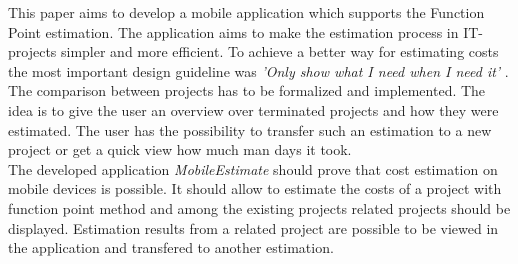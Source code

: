 This paper aims to develop a mobile application which supports the Function Point estimation. The application aims to make the estimation process in IT-projects simpler and more efficient. To achieve a better way for estimating costs the most important design guideline was \textit{'Only show what I need when I need it'} \cite{materialdesign}. The comparison between projects has to be formalized and implemented. The idea is to give the user an overview over terminated projects and how they were estimated. The user has the possibility to transfer such an estimation to a new project or get a quick view how much man days it took.\\
The developed application \textit{MobileEstimate} should prove that cost estimation on mobile devices is possible. It should allow to estimate the costs of a project with function point method and among the existing projects related projects should be displayed. Estimation results from a related project are possible to be viewed in the application and transfered to another estimation.\\
